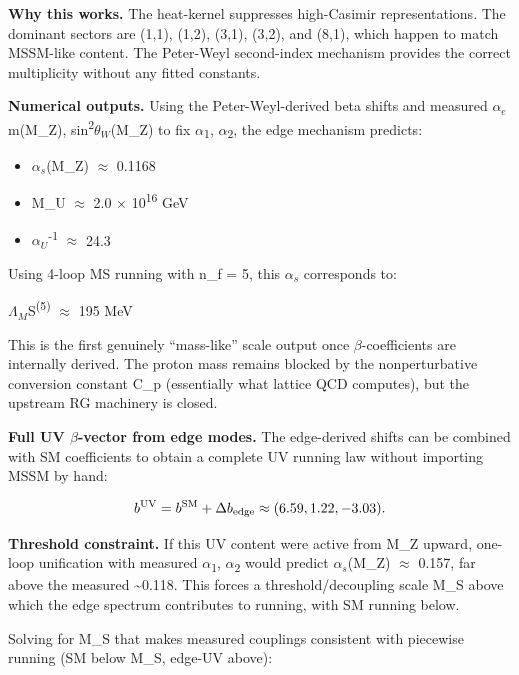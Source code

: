 \documentclass[11pt,a4paper]{article}
\theoremstyle{remark}
\providecommand{\tightlist}{%
  \setlength{\itemsep}{0pt}\setlength{\parskip}{0pt}}
\begin{document}
\textbf{Why this works.} The heat-kernel suppresses high-Casimir representations. The dominant sectors are (1,1), (1,2), (3,1), (3,2), and (8,1), which happen to match MSSM-like content. The Peter-Weyl second-index mechanism provides the correct multiplicity without any fitted constants.

\textbf{Numerical outputs.} Using the Peter-Weyl-derived beta shifts and measured \(\alpha{}_e\)m(M\_Z), sin\textsuperscript{2}\(\theta_W\)(M\_Z) to fix \ensuremath{\alpha}\textsubscript{1}, \ensuremath{\alpha}\textsubscript{2}, the edge mechanism predicts:

\begin{itemize}
\tightlist
\item
  \(\alpha_s\)(M\_Z) \ensuremath{\approx} 0.1168
\item
  M\_U \ensuremath{\approx} 2.0 \ensuremath{\times} 10\textsuperscript{16} GeV
\item
  \(\alpha_U\)\textsuperscript{-1} \ensuremath{\approx} 24.3
\end{itemize}

Using 4-loop MS running with n\_f = 5, this \(\alpha_s\) corresponds to:

\(\Lambda{}_M\)S\textsuperscript{(5)} \ensuremath{\approx} 195 MeV

This is the first genuinely ``mass-like'' scale output once \ensuremath{\beta}-coefficients are
internally derived. The proton mass remains blocked by the nonperturbative
conversion constant C\_p (essentially what lattice QCD computes), but the
upstream RG machinery is closed.

\textbf{Full UV \ensuremath{\beta}-vector from edge modes.} The edge-derived shifts can be combined with SM coefficients to obtain a complete UV running law without importing MSSM by hand:

\[
b^{\rm UV} = b^{\rm SM} + \Delta b_{\rm edge} \approx (6.59, 1.22, -3.03).
\]

\textbf{Threshold constraint.} If this UV content were active from M\_Z upward, one-loop unification with measured \ensuremath{\alpha}\textsubscript{1}, \ensuremath{\alpha}\textsubscript{2} would predict \(\alpha_s\)(M\_Z) \ensuremath{\approx} 0.157, far above the measured \textasciitilde0.118. This forces a threshold/decoupling scale M\_S above which the edge spectrum contributes to running, with SM running below.

Solving for M\_S that makes measured couplings consistent with piecewise running (SM below M\_S, edge-UV above):
\end{document}
